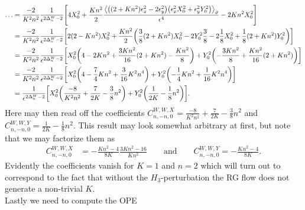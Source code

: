\documentclass[english, parskip=full]{scrartcl}
\begin{document}
\begin{align}
\dots &= \frac{-2}{K^2n^2} \frac{1}{\epsilon^{2\Delta^W_n - 2}} \klb*{4 X_0^2 + \frac{Kn^2}{2} \frac{\bra*{\kla*{(2+Kn^2)\epsilon_x^2 - 2\epsilon_y^2} \kla*{\epsilon_x^2 X_0^2 + \epsilon_y^2 Y_0^2}}_\vartheta}{\epsilon^4}  - 2Kn^2 X_0^2}\\
&= \frac{-2}{K^2n^2} \frac{1}{\epsilon^{2\Delta^W_n - 2}} \klb*{2(2-Kn^2) X_0^2 + \frac{Kn^2}{2} \kla*{\frac{3}{8} (2+Kn^2)X_0^2 - 2Y_0^2 \frac{3}{8} - 2 \frac{1}{8} X_0^2 + \frac{1}{8} (2+Kn^2) Y_0^2}}\\
&= \frac{-2}{K^2n^2} \frac{1}{\epsilon^{2\Delta^W_n - 2}} \klb*{X_0^2 \kla*{4-2Kn^2 + \frac{3Kn^2}{16} (2+Kn^2) - \frac{Kn^2}{8}} + Y_0^2 \kla*{-\frac{3Kn^2}{8} + \frac{Kn^2}{16}(2+Kn^2)}}\\
&= \frac{-2}{K^2n^2} \frac{1}{\epsilon^{2\Delta^W_n - 2}} \klb*{X_0^2 \kla*{4 - \frac{7}{4}Kn^2 + \frac{3}{16} K^2n^4} + Y_0^2 \kla*{-\frac{1}{4}Kn^2 + \frac{1}{16}K^2n^4}}\\
&= \frac{1}{\epsilon^{2\Delta^W_n - 2}} \klb*{X_0^2 \kla*{\frac{-8}{K^2n^2} + \frac{7}{2K} - \frac{3}{8} n^2} + Y_0^2 \kla*{\frac{1}{2K} - \frac{1}{8}n^2}}.
\end{align}
Here may then read off the coefficients $C^{W,W,X}_{n,-n,0} = \frac{-8}{K^2n^2} + \frac{7}{2K} - \frac{3}{8} n^2$ and $C^{W,W,Y}_{n,-n,0} = \frac{1}{2K} - \frac{1}{8}n^2$.
This result may look somewhat arbitrary at first, but note that we may factorize them as
\begin{align}
C^{W,W,X}_{n,-n,0} &= - \frac{Kn^2-4}{8K} \frac{3Kn^2 - 16}{Kn^2} \qquad\text{and} \qquad C^{W,W,Y}_{n,-n,0} = - \frac{Kn^2-4}{8K}.
\end{align}
Evidently the coefficients vanish for $K=1$ and $n=2$ which will turn out to correspond to the fact that without the $H_3$-perturbation the RG flow does not generate a non-trivial $K$.\\
Lastly we need to compute the OPE
\end{document}
